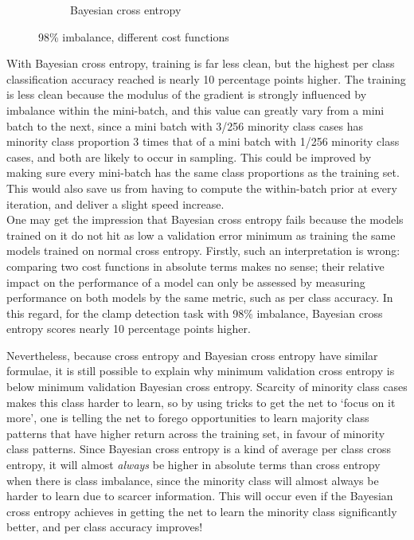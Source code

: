 \documentclass[a4paper,11pt]{article}
\begin{document}
\begin{figure}
\begin{minipage}[b]{\textwidth}
\begin{subfigure}{.5\textwidth}
        \caption{Bayesian cross entropy}\label{fig:2b}
      \end{subfigure} \par \vspace*{20pt} %
      \caption{98\% imbalance, different cost functions}\label{fig:2}
    \end{minipage}%
\end{figure}

With Bayesian cross entropy, training is far less clean, but the highest per class classification accuracy reached is nearly 10 percentage points higher. The training is less clean because the modulus of the gradient is strongly influenced by imbalance within the mini-batch, and this value can greatly vary from a mini batch to the next, since a mini batch with 3/256 minority class cases has minority class proportion 3 times that of a mini batch with 1/256 minority class cases, and both are likely to occur in sampling. This could be improved by making sure every mini-batch has the same class proportions as the training set. This would also save us from having to compute the within-batch prior at every iteration, and deliver a slight speed increase.  \\

One may get the impression that Bayesian cross entropy fails because the models trained on it do not hit as low a validation error minimum as training the same models trained on normal cross entropy. Firstly, such an interpretation is wrong: comparing two cost functions in absolute terms makes no sense; their relative impact on the performance of a model can only be assessed by measuring performance on both models by the same metric, such as per class accuracy. In this regard, for the clamp detection task with 98\% imbalance, Bayesian cross entropy scores nearly 10 percentage points higher.

Nevertheless, because cross entropy and Bayesian cross entropy have similar formulae, it is still possible to explain why minimum validation cross entropy is below minimum validation Bayesian cross entropy. Scarcity of minority class cases makes this class harder to learn, so by using tricks to get the net to `focus on it more', one is telling the net to forego opportunities to learn majority class patterns that have higher return across the training set, in favour of minority class patterns. Since Bayesian cross entropy is a kind of average per class cross entropy, it will almost \textit{always} be higher in absolute terms than cross entropy when there is class imbalance, since the minority class will almost always be harder to learn due to scarcer information. This will occur even if the Bayesian cross entropy achieves in getting the net to learn the minority class significantly better, and per class accuracy improves! 
\end{document}
